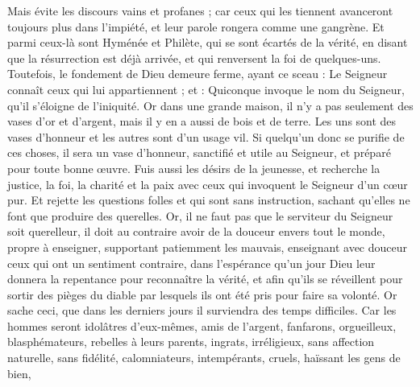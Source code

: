 \begin{multicols}{2}
Mais évite les discours vains et profanes ; car ceux qui les tiennent avanceront toujours plus dans l'impiété,
et leur parole rongera comme une gangrène. Et parmi ceux-là sont Hyménée et Philète,
qui se sont écartés de la vérité, en disant que la résurrection est déjà arrivée, et qui renversent la foi de quelques-uns.
Toutefois, le fondement de Dieu demeure ferme, ayant ce sceau : Le Seigneur connaît ceux qui lui appartiennent ; et : Quiconque invoque le nom du Seigneur, qu'il s'éloigne de l'iniquité.
Or dans une grande maison, il n'y a pas seulement des vases d'or et d'argent, mais il y en a aussi de bois et de terre. Les uns sont des vases d'honneur et les autres sont d'un usage vil.
Si quelqu'un donc se purifie de ces choses, il sera un vase d'honneur, sanctifié et utile au Seigneur, et préparé pour toute bonne œuvre.
Fuis aussi les désirs de la jeunesse, et recherche la justice, la foi, la charité et la paix avec ceux qui invoquent le Seigneur d'un cœur pur.
Et rejette les questions folles et qui sont sans instruction, sachant qu'elles ne font que produire des querelles.
Or, il ne faut pas que le serviteur du Seigneur soit querelleur, il doit au contraire avoir de la douceur envers tout le monde, propre à enseigner, supportant patiemment les mauvais,
enseignant avec douceur ceux qui ont un sentiment contraire, dans l'espérance qu'un jour Dieu leur donnera la repentance pour reconnaître la vérité,
et afin qu'ils se réveillent pour sortir des pièges du diable par lesquels ils ont été pris pour faire sa volonté.
\VerseOne{}Or sache ceci, que dans les derniers jours il surviendra des temps difficiles.
Car les hommes seront idolâtres d'eux-mêmes, amis de l'argent, fanfarons, orgueilleux, blasphémateurs, rebelles à leurs parents, ingrats, irréligieux,
sans affection naturelle, sans fidélité, calomniateurs, intempérants, cruels, haïssant les gens de bien,

\end{multicols}
